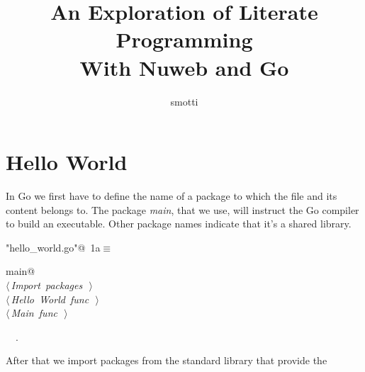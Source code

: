 \documentclass[a4paper]{report}
\title{An Exploration of Literate Programming\\ With Nuweb and Go}
\date{}
\author{smotti}
\begin{document}
\begin{titlepage}
\maketitle
\end{titlepage}

\tableofcontents

\chapter{Hello World}

In Go we first have to define the name of a package to which the file and its
content belongs to. The package \textit{main}, that we use, will instruct the
Go compiler to build an executable. Other package names indicate that it's a
shared library.
\begin{flushleft} \small
\begin{minipage}{\linewidth}\label{scrap1}\raggedright\small
{} \verb@"hello_world.go"@\nobreak\ {\footnotesize {1a}}$\equiv$
\vspace{-1ex}
\begin{list}{}{} \item
\mbox{}\lstinline@package main@\\
\mbox{}\lstinline@@\hbox{$\langle\,${\itshape Import packages}\nobreak\ {\footnotesize {}}$\,\rangle$}\lstinline@@\\
\mbox{}\lstinline@@\hbox{$\langle\,${\itshape Hello World func}\nobreak\ {\footnotesize {}}$\,\rangle$}\lstinline@@\\
\mbox{}\lstinline@@\hbox{$\langle\,${\itshape Main func}\nobreak\ {\footnotesize {}}$\,\rangle$}\lstinline@@\\
\mbox{}\lstinline@@{\NWsep}
\end{list}
\vspace{-1.5ex}
\footnotesize
\begin{list}{}{\setlength{\itemsep}{-\parsep}\setlength{\itemindent}{-\leftmargin}}
\item \NWtxtIdentsUsed\nobreak\  \verb@main@\nobreak\ .
\item{}
\end{list}
\end{minipage}\vspace{4ex}
\end{flushleft}
After that we import packages from the standard library that provide the
\end{document}
